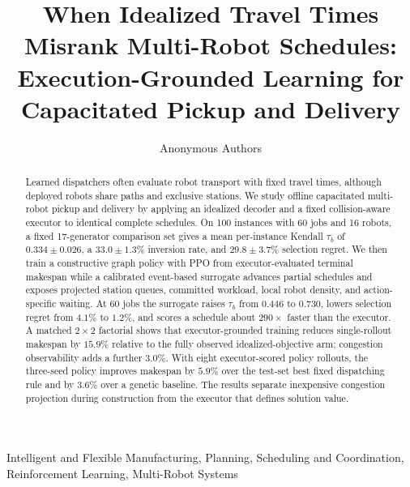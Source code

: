 \documentclass[letterpaper,10pt,conference]{ieeeconf}
\begin{document}
\title{When Idealized Travel Times Misrank Multi-Robot Schedules:
Execution-Grounded Learning for Capacitated Pickup and Delivery}

\author{Anonymous Authors}

\maketitle

\begin{abstract}
Learned dispatchers often evaluate robot transport with fixed travel times,
although deployed robots share paths and exclusive stations. We study offline
capacitated multi-robot pickup and delivery by applying an idealized decoder
and a fixed collision-aware executor to identical complete schedules. On 100
instances with 60 jobs and 16 robots, a fixed 17-generator comparison set
gives a mean per-instance Kendall $\tau_b$ of $0.334\!\pm\!0.026$, a
$33.0\!\pm\!1.3\%$ inversion rate, and $29.8\!\pm\!3.7\%$ selection regret.
We then train a constructive graph policy with PPO from executor-evaluated
terminal makespan while a calibrated event-based surrogate advances partial
schedules and exposes projected station queues, committed workload, local
robot density, and action-specific waiting. At 60 jobs the surrogate raises
$\tau_b$ from $0.446$ to $0.730$, lowers selection regret from $4.1\%$ to
$1.2\%$, and scores a schedule about $290\times$ faster than the executor. A
matched $2\times2$ factorial shows that executor-grounded training reduces
single-rollout makespan by $15.9\%$ relative to the fully observed
idealized-objective arm; congestion observability adds a further $3.0\%$.
With eight executor-scored policy rollouts, the three-seed policy improves
makespan by $5.9\%$ over the test-set best fixed dispatching rule and by
$3.6\%$ over a genetic baseline. The results separate inexpensive congestion
projection during construction from the executor that defines solution value.
\end{abstract}

\begin{keywords}
Intelligent and Flexible Manufacturing, Planning, Scheduling and
Coordination, Reinforcement Learning, Multi-Robot Systems
\end{keywords}

\end{document}
